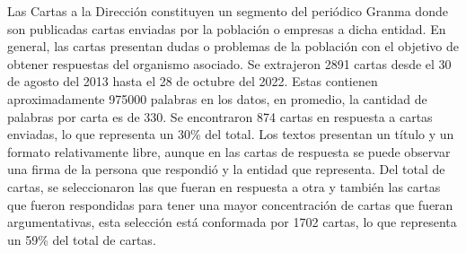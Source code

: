 \documentclass[a4paper,11pt,twocolumn,twoside]{article}
\begin{document}
Las Cartas a la Dirección constituyen un segmento del periódico Granma donde son publicadas
cartas enviadas por la población o empresas a dicha entidad. En general, las cartas 
presentan dudas o problemas de la población con el objetivo de obtener respuestas del organismo
asociado. Se extrajeron 2891 cartas desde el 30 de agosto del 2013 hasta el 28 de octubre del 2022. Estas 
contienen aproximadamente 975000 palabras en los datos, en promedio, la cantidad de palabras por carta es de 330.
Se encontraron 874 cartas en respuesta a cartas enviadas, lo que representa un 30\% del total. 
Los textos presentan un título y un formato relativamente libre, 
aunque en las cartas de respuesta se puede observar una firma de la persona que respondió y la entidad que 
representa. Del total de cartas, se seleccionaron las que fueran en respuesta a otra y también las 
cartas que fueron respondidas para tener una mayor concentración de cartas que fueran argumentativas, 
esta selección está conformada por 1702 cartas, lo que representa un 59\% del total de cartas.



\end{document}
